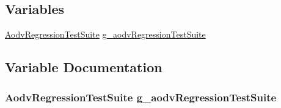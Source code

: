 \subsection*{Variables}
\begin{DoxyCompactItemize}
\item 
\hyperlink{classAodvRegressionTestSuite}{Aodv\+Regression\+Test\+Suite} \hyperlink{aodv-regression_8cc_a5ae1640d1952e471a24a38fa8ea8c75d}{g\+\_\+aodv\+Regression\+Test\+Suite}
\end{DoxyCompactItemize}


\subsection{Variable Documentation}
\subsubsection[{\texorpdfstring{g\+\_\+aodv\+Regression\+Test\+Suite}{g_aodvRegressionTestSuite}}]{\setlength{\rightskip}{0pt plus 5cm} {\bf Aodv\+Regression\+Test\+Suite}  g\+\_\+aodv\+Regression\+Test\+Suite}\hypertarget{aodv-regression_8cc_a5ae1640d1952e471a24a38fa8ea8c75d}{}\label{aodv-regression_8cc_a5ae1640d1952e471a24a38fa8ea8c75d}
